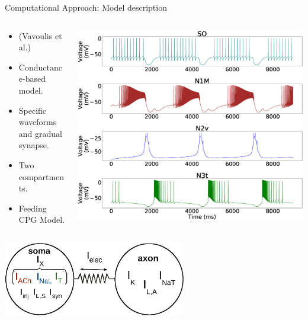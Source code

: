 \documentclass[aspectratio=43]{beamer}
\begin{document}
\begin{frame}{Computational Approach: Model description}
	\begin{columns}
		\begin{column}{0.5\textwidth}
			\begin{itemize}
				\item<1->(Vavoulis et al.)
				\item<1->Conductance-based model.
				\item<1->Specific waveforms and gradual synapse.
				\item<1->Two compartments.
				\item<1->Feeding CPG Model.
			\end{itemize}
		\end{column}
		\begin{column}{0.5\textwidth}
			\includegraphics[width=\textwidth]{methods/invariants-model/figure2.eps}
		\end{column}
	\end{columns}
		\vspace{4pt}
		\centering
		\includegraphics[width=0.6\textwidth]{methods/invariants-model/figure1a.eps}
\end{frame}
\end{document}
